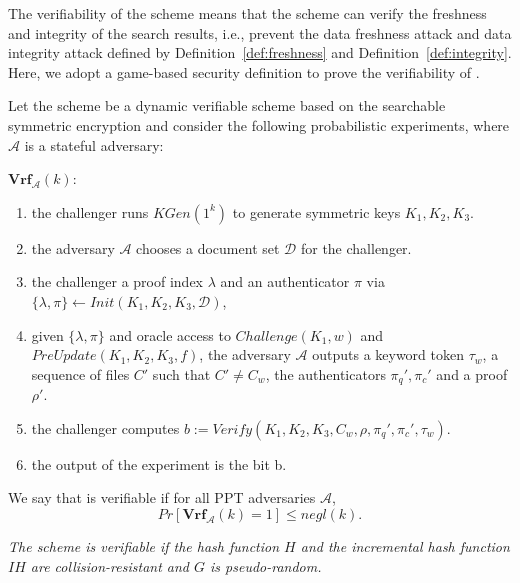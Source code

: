  The verifiability of the \name scheme means that the scheme can verify the freshness and integrity of the search results, i.e., prevent the data freshness attack and data integrity attack defined by Definition~\ref{def:freshness} and Definition~\ref{def:integrity}. Here, we adopt a game-based security definition to prove the verifiability of \name.
\begin{definition}
  \itshape{
      Let the \name scheme be a dynamic verifiable scheme based on the searchable symmetric encryption and consider the following probabilistic experiments, where $\mathcal{A}$ is a stateful adversary:

      \noindent$\mathbf{Vrf}_\mathcal{A}(k)$:
      \begin{enumerate}[1.]
        \item the challenger runs $KGen(1^k)$ to generate symmetric keys {$K_1,K_2,K_3$}.
        \item the adversary $\mathcal{A}$ chooses a document set $\mathcal{D}$ for the challenger.
        \item the challenger  a proof index $\lambda$ and an authenticator $\pi$ via $\{\lambda,\pi\} \leftarrow Init(K_1,K_2,K_3,\mathcal{D})$,
        \item given $\{\lambda,\pi\}$ and oracle access to $Challenge(K_1,w)$ and $PreUpdate(K_1,K_2,K_3,f)$, the adversary $\mathcal{A}$ outputs a keyword token $\tau_w$, a sequence of files $C'$ such that $C' \neq C_w$, the authenticators $\pi_q',\pi_c'$ and a proof $\rho'$.
        \item the challenger computes $b:=Verify(K_1,K_2,K_3,C_w,\rho,\pi_q',\pi_c',\tau_w)$.
        \item the output of the experiment is the bit b.
      \end{enumerate}
      We say that \name is verifiable if for all PPT adversaries $\mathcal{A}$, $$Pr[\mathbf{Vrf}_\mathcal{A}(k)=1] \leq negl(k).$$
  }
\end{definition}

\begin{theorem}
  {\itshape
    The \name scheme is verifiable if the hash function $H$ and the incremental hash function $IH$ are collision-resistant and $G$ is pseudo-random.
  }
\end{theorem}

